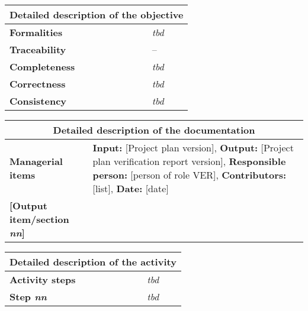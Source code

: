 \documentclass{template/openetcs_report}
\begin{document}
\begin{tabular}{|p{3.2cm}|p{11cm}|}
  \hline
  \multicolumn{2}{|c|}{\textbf{Detailed description of the objective}} \\\hline
  \textbf{Formalities} & \textit{tbd}
  \\\hline
  \textbf{Traceability} & --
  \\\hline
  \textbf{Completeness} & \textit{tbd}
  \\\hline
  \textbf{Correctness} & \textit{tbd}
  \\\hline
  \textbf{Consistency} & \textit{tbd}
  \\\hline
\end{tabular}

%
\begin{tabular}{|p{3.2cm}|p{11cm}|}
  \hline
  \multicolumn{2}{|c|}{\textbf{Detailed description of the
      documentation}} \\\hline
  \textbf{Managerial items} & \textbf{Input:} [Project plan version],
  \textbf{Output:} [Project plan verification report version],
  \textbf{Responsible person:} [person of role VER],
  \textbf{Contributors:} [list], \textbf{Date:} [date]
  \\\hline
  \textbf{[Output item/section \textit{nn}]} & 
  \\\hline
\end{tabular}



\begin{tabular}{|p{3.2cm}|p{11cm}|}
  \hline
  \multicolumn{2}{|c|}{\textbf{Detailed description of the activity}} \\\hline
  \textbf{Activity steps} & \textit{tbd}
  \\\hline
  \textbf{Step \textit{nn}} & \textit{tbd}
  \\\hline
\end{tabular}
\end{document}

